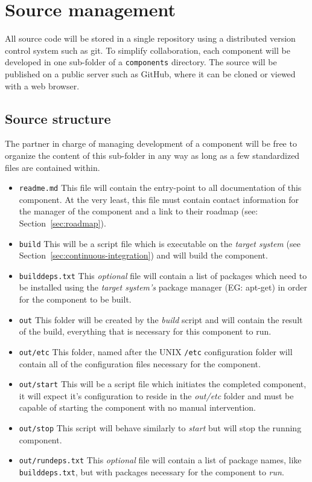 \section{Source management}
\label{sec:source-management}

All source code will be stored in a single repository using a distributed version control
system such as git. To simplify collaboration, each component will be developed in one
sub-folder of a \texttt{components} directory. The source will be published on a public
server such as GitHub, where it can be cloned or viewed with a web browser.

\subsection{Source structure}
\label{sec:source-structure}
The partner in charge of managing development of a component will be free to organize the content
of this sub-folder in any way as long as a few standardized files are contained within.

\begin{itemize}
\item \texttt{readme.md} This file will contain the entry-point to all documentation of this
component. At the very least, this file must contain contact information for the manager of
the component and a link to their roadmap (see: Section~\ref{sec:roadmap}).
\item \texttt{build} This will be a script file which is executable on the \emph{target system}
(see Section~\ref{sec:continuous-integration}) and will build the component.
\item \texttt{builddeps.txt} This \emph{optional} file will contain a list of packages which
need to be installed using the \emph{target system's} package manager (EG: apt-get) in order for
the component to be built.
\item \texttt{out} This folder will be created by the \emph{build} script and will contain the
result of the build, everything that is necessary for this component to run.
\item \texttt{out/etc} This folder, named after the UNIX \texttt{/etc} configuration folder will
contain all of the configuration files necessary for the component.
\item \texttt{out/start} This will be a script file which initiates the completed component, it will
expect it's configuration to reside in the \emph{out/etc} folder and must be capable of starting
the component with no manual intervention.
\item \texttt{out/stop} This script will behave similarly to \emph{start} but will stop the running
component.
\item \texttt{out/rundeps.txt} This \emph{optional} file will contain a list of package names,
like \texttt{builddeps.txt}, but with packages necessary for the component to \emph{run}.
\end{itemize}

